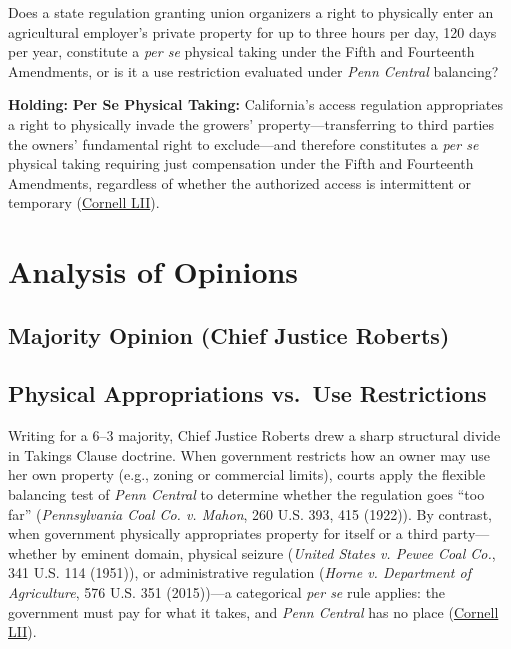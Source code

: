 \documentclass[12pt]{article}
\begin{document}
Does a state regulation granting union organizers a right to physically enter an agricultural employer's private property for up to three hours per day, 120 days per year, constitute a \emph{per se} physical taking under the Fifth and Fourteenth Amendments, or is it a use restriction evaluated under \textit{Penn Central} balancing?

\textbf{Holding:} \textbf{Per Se Physical Taking:} California's access regulation appropriates a right to physically invade the growers' property---transferring to third parties the owners' fundamental right to exclude---and therefore constitutes a \emph{per se} physical taking requiring just compensation under the Fifth and Fourteenth Amendments, regardless of whether the authorized access is intermittent or temporary (\href{https://www.law.cornell.edu/supremecourt/text/20-107}{Cornell LII}).

\section{Analysis of Opinions}
\subsection{Majority Opinion (Chief Justice Roberts)}

\subsection{Physical Appropriations vs.\ Use Restrictions}
Writing for a 6--3 majority, Chief Justice Roberts drew a sharp structural divide in Takings Clause doctrine. When government restricts how an owner may use her own property (e.g., zoning or commercial limits), courts apply the flexible balancing test of \textit{Penn Central} to determine whether the regulation goes ``too far'' (\textit{Pennsylvania Coal Co. v. Mahon}, 260 U.S. 393, 415 (1922)). By contrast, when government physically appropriates property for itself or a third party---whether by eminent domain, physical seizure (\textit{United States v. Pewee Coal Co.}, 341 U.S. 114 (1951)), or administrative regulation (\textit{Horne v. Department of Agriculture}, 576 U.S. 351 (2015))---a categorical \emph{per se} rule applies: the government must pay for what it takes, and \textit{Penn Central} has no place (\href{https://www.law.cornell.edu/supremecourt/text/20-107}{Cornell LII}).
\end{document}
